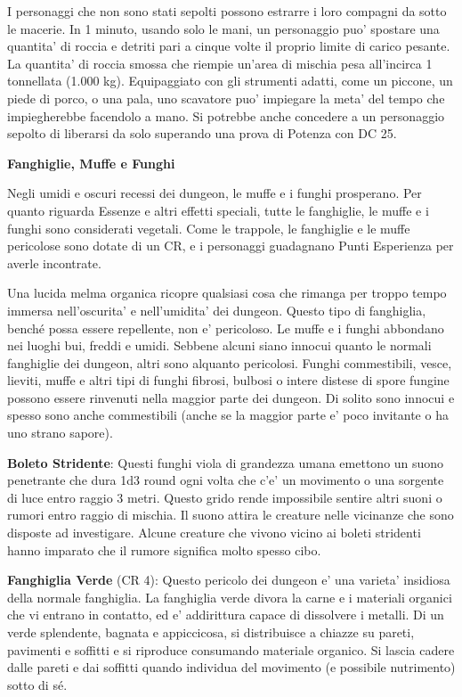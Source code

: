 \documentclass[a4paper,11pt,twoside,openany]{book}
\begin{document}
{		I personaggi che non sono stati sepolti possono estrarre i loro compagni da sotto le macerie. In 1 minuto, usando solo le mani, un personaggio puo' spostare una quantita' di roccia e detriti pari a cinque volte il proprio limite di carico pesante. La quantita' di roccia smossa che riempie un'area di mischia pesa all'incirca 1 tonnellata (1.000 kg). Equipaggiato con gli strumenti adatti, come un piccone, un piede di porco, o una pala, uno scavatore puo' impiegare la meta' del tempo che impiegherebbe facendolo a mano. Si potrebbe anche concedere a un personaggio sepolto di liberarsi da solo superando una prova di Potenza con DC 25.
		
		\textbf{Fanghiglie, Muffe e Funghi}
		
		Negli umidi e oscuri recessi dei dungeon, le muffe e i funghi prosperano. Per quanto riguarda Essenze e altri effetti speciali, tutte le fanghiglie, le muffe e i funghi sono considerati vegetali. Come le trappole, le fanghiglie e le muffe pericolose sono dotate di un CR, e i personaggi guadagnano Punti Esperienza per averle incontrate.
		
		Una lucida melma organica ricopre qualsiasi cosa che rimanga per troppo tempo immersa nell'oscurita' e nell'umidita' dei dungeon. Questo tipo di fanghiglia, benché possa essere repellente, non e' pericoloso. Le muffe e i funghi abbondano nei luoghi bui, freddi e umidi. Sebbene alcuni siano innocui quanto le normali fanghiglie dei dungeon, altri sono alquanto pericolosi. Funghi commestibili, vesce, lieviti, muffe e altri tipi di funghi fibrosi, bulbosi o intere distese di spore fungine possono essere rinvenuti nella maggior parte dei dungeon. Di solito sono innocui e spesso sono anche commestibili (anche se la maggior parte e' poco invitante o ha uno strano sapore).
		
		\textbf{Boleto Stridente}: Questi funghi viola di grandezza umana emettono un suono penetrante che dura 1d3 round ogni volta che c'e' un movimento o una sorgente di luce entro raggio 3 metri. Questo grido rende impossibile sentire altri suoni o rumori entro raggio di mischia. Il suono attira le creature nelle vicinanze che sono disposte ad investigare. Alcune creature che vivono vicino ai boleti stridenti hanno imparato che il rumore significa molto spesso cibo.
		
		\textbf{Fanghiglia Verde} (CR 4): Questo pericolo dei dungeon e' una varieta' insidiosa della normale fanghiglia. La fanghiglia verde divora la carne e i materiali organici che vi entrano in contatto, ed e' addirittura capace di dissolvere i metalli. Di un verde splendente, bagnata e appiccicosa, si distribuisce a chiazze su pareti, pavimenti e soffitti e si riproduce consumando materiale organico. Si lascia cadere dalle pareti e dai soffitti quando individua del movimento (e possibile nutrimento) sotto di sé.
		
}
\end{document}
